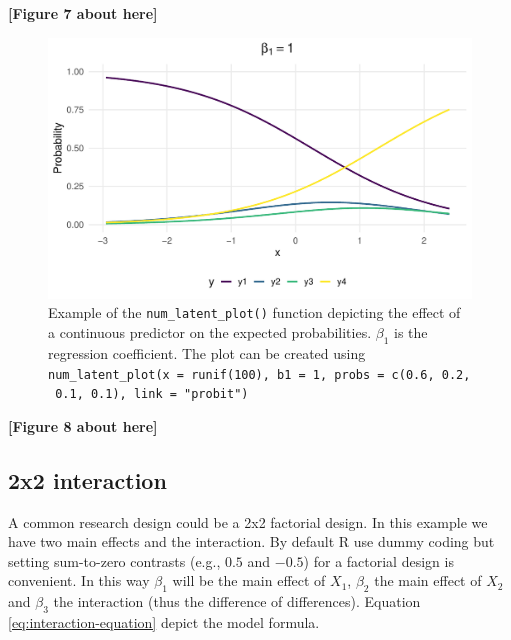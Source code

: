 \documentclass[
  man, mask,floatsintext]{apa6}
\begin{document}
\begin{center}\textbf{[Figure 7 about here]} \end{center}

\normalsize

\scriptsize

\begin{figure}

{\centering \includegraphics[width=1\linewidth]{paper_files/figure-latex/fig-example-num-latent-1} 

}

\caption{Example of the \texttt{num\_latent\_plot()} function depicting the effect of a continuous predictor on the expected probabilities. \(\beta_1\) is the regression coefficient. The plot can be created using \texttt{num\_latent\_plot(x\ =\ runif(100),\ b1\ =\ 1,\ probs\ =\ c(0.6,\ 0.2,\ 0.1,\ 0.1),\ link\ =\ "probit")}}\label{fig:fig-example-num-latent}
\end{figure}

\begin{center}\textbf{[Figure 8 about here]} \end{center}

\normalsize

\subsection{2x2 interaction}\label{x2-interaction}

A common research design could be a 2x2 factorial design. In this example we have two main effects and the interaction. By default R use dummy coding but setting sum-to-zero contrasts (e.g., \(0.5\) and \(-0.5\)) for a factorial design is convenient. In this way \(\beta_1\) will be the main effect of \(X_1\), \(\beta_2\) the main effect of \(X_2\) and \(\beta_3\) the interaction (thus the difference of differences). Equation \eqref{eq:interaction-equation} depict the model formula.
\end{document}
